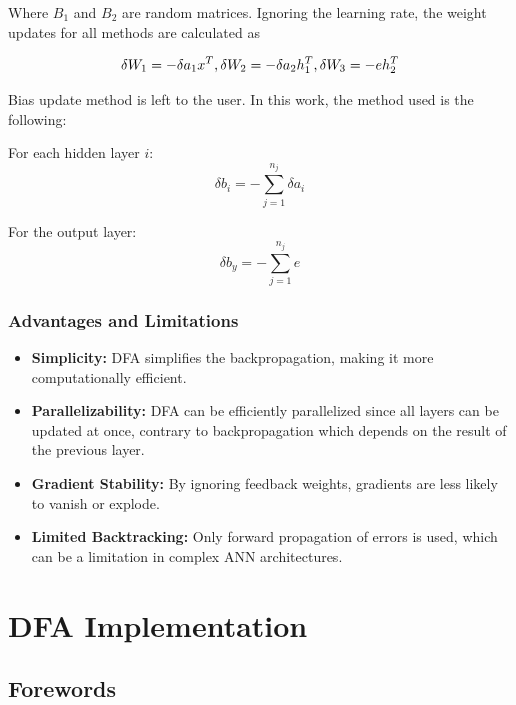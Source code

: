 \documentclass[english]{article}
\begin{document}
Where \(B_1\) and \(B_2\) are random matrices.
Ignoring the learning rate, the weight updates for all methods are calculated as

\begin{equation}
    \delta W_1 = -\delta a_1 x^T, \\
    \delta W_2 = -\delta a_2 h_1^T, \\
    \delta W_3 = -e h_2^T
\end{equation}

Bias update method is left to the user. In this work, the method used is the following:

For each hidden layer \(i\):
\begin{equation}
    \delta b_i = -\sum_{j=1}^{n_j} \delta a_i
\end{equation}

For the output layer:
\begin{equation}
    \delta b_y = -\sum_{j=1}^{n_j} e
\end{equation}




\subsubsection{Advantages and Limitations}


\begin{itemize}[label=]
    \item \textbf{Simplicity:} DFA simplifies the backpropagation, making it more computationally efficient.
    \item \textbf{Parallelizability:} DFA can be efficiently parallelized since all layers can be updated at once, contrary to backpropagation which depends on the result of the previous layer.
    \item \textbf{Gradient Stability:} By ignoring feedback weights, gradients are less likely to vanish or explode.
    \item \textbf{Limited Backtracking:} Only forward propagation of errors is used, which can be a limitation in complex ANN architectures.
\end{itemize}





\section{DFA Implementation}

\subsection{Forewords}
\end{document}
